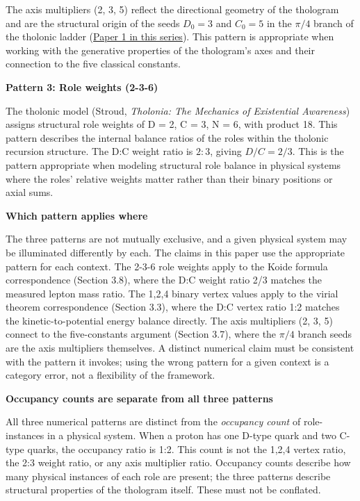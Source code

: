 \documentclass[12pt]{article}
\begin{document}
The axis multipliers (2, 3, 5) reflect the directional geometry of the
thologram and are the structural origin of the seeds \(D_0 = 3\) and
\(C_0 = 5\) in the \(\pi/4\) branch of the tholonic ladder
(\href{https://github.com/baardev/truevalue/blob/main/docnav/Research/papers/1_recursive-tholonic-five-constants/1_recursive-tholonic-five-constants.pdf}{Paper
1 in this series}). This pattern is appropriate when working with the
generative properties of the thologram's axes and their connection to
the five classical constants.

\textbf{Pattern 3: Role weights (2-3-6)}

The tholonic model (Stroud, \emph{Tholonia: The Mechanics of Existential
Awareness}) assigns structural role weights of D = 2, C = 3, N = 6, with
product 18. This pattern describes the internal balance ratios of the
roles within the tholonic recursion structure. The D:C weight ratio is
\(2:3\), giving \(D/C = 2/3\). This is the pattern appropriate when
modeling structural role balance in physical systems where the roles'
relative weights matter rather than their binary positions or axial
sums.

\textbf{Which pattern applies where}

The three patterns are not mutually exclusive, and a given physical
system may be illuminated differently by each. The claims in this paper
use the appropriate pattern for each context. The 2-3-6 role weights
apply to the Koide formula correspondence (Section 3.8), where the D:C
weight ratio 2/3 matches the measured lepton mass ratio. The 1,2,4
binary vertex values apply to the virial theorem correspondence (Section
3.3), where the D:C vertex ratio 1:2 matches the kinetic-to-potential
energy balance directly. The axis multipliers (2, 3, 5) connect to the
five-constants argument (Section 3.7), where the \(\pi/4\) branch seeds
are the axis multipliers themselves. A distinct numerical claim must be
consistent with the pattern it invokes; using the wrong pattern for a
given context is a category error, not a flexibility of the framework.

\textbf{Occupancy counts are separate from all three patterns}

All three numerical patterns are distinct from the \emph{occupancy
count} of role-instances in a physical system. When a proton has one
D-type quark and two C-type quarks, the occupancy ratio is 1:2. This
count is not the 1,2,4 vertex ratio, the 2:3 weight ratio, or any axis
multiplier ratio. Occupancy counts describe how many physical instances
of each role are present; the three patterns describe structural
properties of the thologram itself. These must not be conflated.
\end{document}
